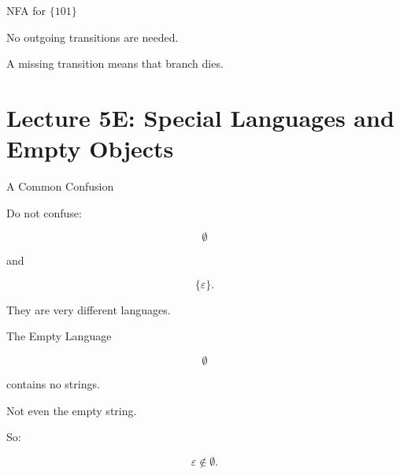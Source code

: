 \documentclass[10pt,aspectratio=169]{beamer}
\newcommand{\eps}{\varepsilon}
\begin{document}
\begin{frame}{NFA for \(\{101\}\)}

\begin{center}
\end{center}

\vspace{0.5em}

No outgoing transitions are needed.

A missing transition means that branch dies.

\end{frame}

\section{Lecture 5E: Special Languages and Empty Objects}

\begin{frame}{A Common Confusion}

Do not confuse:

\[
\emptyset
\]

and

\[
\{\eps\}.
\]

\vspace{1em}

They are very different languages.

\end{frame}

\begin{frame}{The Empty Language}

\[
\emptyset
\]

contains no strings.

\vspace{1em}

Not even the empty string.

\vspace{1em}

So:

\[
\eps\notin\emptyset.
\]

\end{frame}
\end{document}
